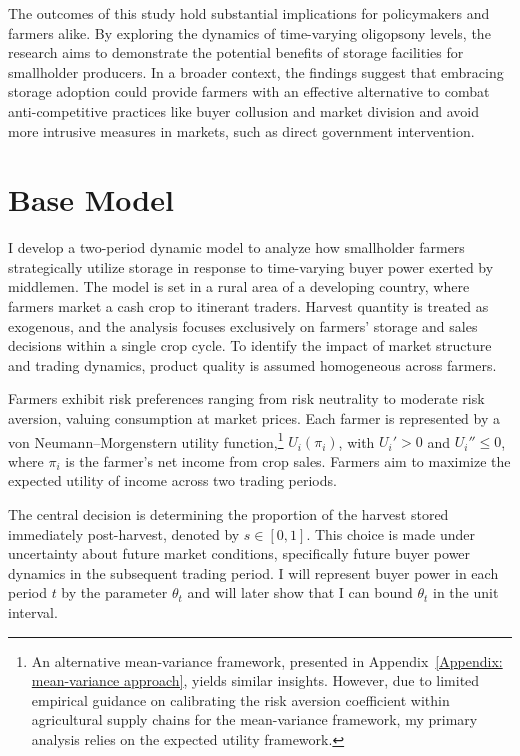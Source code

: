 The outcomes of this study hold substantial implications for policymakers and farmers alike. By exploring the dynamics of time-varying oligopsony levels, the research aims to demonstrate the potential benefits of storage facilities for smallholder producers. In a broader context, the findings suggest that embracing storage adoption could provide farmers with an effective alternative to combat anti-competitive practices like buyer collusion and market division and avoid more intrusive measures in markets, such as direct government intervention.





\section{Base Model}
\noindent I develop a two-period dynamic model to analyze how smallholder farmers strategically utilize storage in response to time-varying buyer power exerted by middlemen. The model is set in a rural area of a developing country, where farmers market a cash crop to itinerant traders. Harvest quantity is treated as exogenous, and the analysis focuses exclusively on farmers' storage and sales decisions within a single crop cycle. To identify the impact of market structure and trading dynamics, product quality is assumed homogeneous across farmers.

Farmers exhibit risk preferences ranging from risk neutrality to moderate risk aversion, valuing consumption at market prices. Each farmer is represented by a von Neumann–Morgenstern utility function,\footnote{An alternative mean-variance framework, presented in Appendix~\ref{Appendix: mean-variance approach}, yields similar insights. However, due to limited empirical guidance on calibrating the risk aversion coefficient within agricultural supply chains for the mean-variance framework, my primary analysis relies on the expected utility framework.} $U_i(\pi_i)$, with $U_i' > 0$ and $U_i'' \leq 0$, where $\pi_i$ is the farmer's net income from crop sales. Farmers aim to maximize the expected utility of income across two trading periods.

The central decision is determining the proportion of the harvest stored immediately post-harvest, denoted by $s \in [0,1]$. This choice is made under uncertainty about future market conditions, specifically future buyer power dynamics in the subsequent trading period. I will represent buyer power in each period $t$ by the parameter $\theta_t$ and will later show that I can bound $\theta_t$ in the unit interval.

